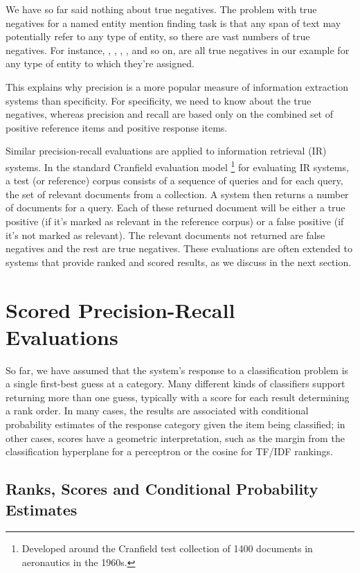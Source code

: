 We have so far said nothing about true negatives.  The problem with
true negatives for a named entity mention finding task is that any
span of text may potentially refer to any type of entity, so there are
vast numbers of true negatives.  For instance, ,
, ,
, and so on, are all true negatives
in our example for any type of entity to which they're assigned.

This explains why precision is a more popular measure of information
extraction systems than specificity.  For specificity, we need to know
about the true negatives, whereas precision and recall are based only
on the combined set of positive reference items and positive response
items.

Similar precision-recall evaluations are applied to information
retrieval (IR) systems.  In the standard Cranfield evaluation model%
%
\footnote{Developed around the Cranfield test collection of 1400
documents in aeronautics in the 1960s.}
%
for evaluating IR systems, a test (or reference) corpus consists of a
sequence of queries and for each query, the set of relevant documents
from a collection.  A system then returns a number of documents for a
query.  Each of these returned document will be either a true positive
(if it's marked as relevant in the reference corpus) or a false
positive (if it's not marked as relevant).  The relevant documents not
returned are false negatives and the rest are true negatives.  These
evaluations are often extended to systems that provide ranked and
scored results, as we discuss in the next section.


\section{Scored Precision-Recall Evaluations}

So far, we have assumed that the system's response to a classification
problem is a single first-best guess at a category.  Many different
kinds of classifiers support returning more than one guess, typically
with a score for each result determining a rank order.  In many cases,
the results are associated with conditional probability estimates of
the response category given the item being classified; in other cases,
scores have a geometric interpretation, such as the margin from the
classification hyperplane for a perceptron or the cosine for TF/IDF
rankings.


\subsection{Ranks, Scores and Conditional Probability Estimates}

